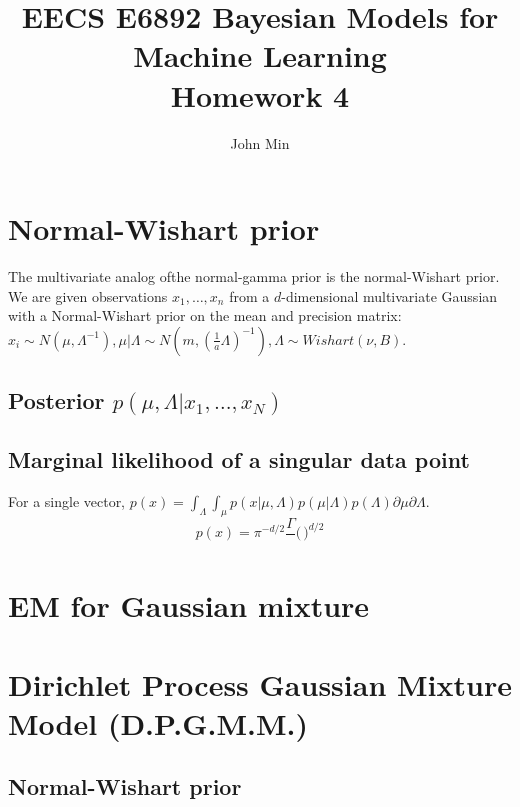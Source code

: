 \documentclass{article}
\author{John Min}
\title{EECS E6892 Bayesian Models for Machine Learning \\ Homework 4}
\begin{document}
\maketitle


\section{Normal-Wishart prior}

\noindent
The multivariate analog ofthe normal-gamma prior is the normal-Wishart prior. \\

\noindent
We are given observations $x_1, \ldots, x_n$ from a $d$-dimensional multivariate Gaussian with a Normal-Wishart prior on the mean and precision matrix:  $x_i \sim N(\mu, \Lambda^{-1}), \mu | \Lambda \sim N(m, (\frac{1}{a} \Lambda)^{-1}), \Lambda \sim Wishart(\nu, B).$  \\

\subsection{Posterior $p(\mu, \Lambda | x_1, \ldots, x_N)$}

\subsection{Marginal likelihood of a singular data point}
For a single vector, $p(x) = \int_\Lambda \int_\mu p(x|\mu, \Lambda) p(\mu|\Lambda) p(\Lambda) \partial \mu \partial \Lambda.$ \\

$$p(x) = \pi^{-d/2} \frac{\Gamma}{} \Bigg( \frac{}{} \Bigg )^{d/2}$$




\section{EM for Gaussian mixture}

\section{Dirichlet Process Gaussian Mixture Model (D.P.G.M.M.)}
\subsection{Normal-Wishart prior}
\end{document}
